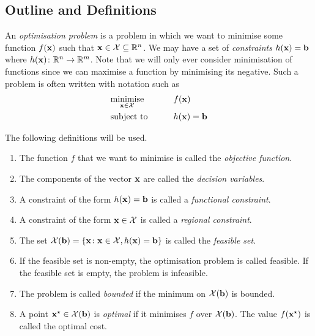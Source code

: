 \subsection{Outline and Definitions}
An \textit{optimisation problem} is a problem in which we want to minimise some function \(f(\vb x)\) such that \(\vb x \in \mathcal X \subseteq \mathbb R^n\).
We may have a set of \textit{constraints} \(h(\vb x) = \vb b\) where \(h(\vb x) \colon \mathbb R^n \to \mathbb R^m\).
Note that we will only ever consider minimisation of functions since we can maximise a function by minimising its negative.
Such a problem is often written with notation such as
\begin{alignat*}{2}
	 & \underset{\vb x \in \mathcal X}{\text{minimise}} & \qquad & f(\vb x)         \\
	 & \text{subject to}                                &        & h(\vb x) = \vb b
\end{alignat*}

\begin{definition}
	The following definitions will be used.
	\begin{enumerate}
		\item The function \(f\) that we want to minimise is called the \textit{objective function}.
		\item The components of the vector \(\vb x\) are called the \textit{decision variables}.
		\item A constraint of the form \(h(\vb x) = \vb b\) is called a \textit{functional constraint}.
		\item A constraint of the form \(\vb x \in \mathcal X\) is called a \textit{regional constraint}.
		\item The set \( \mathcal X(\vb b) = \qty{\vb x \colon \vb x \in \mathcal X, h(\vb x) = \vb b} \) is called the \textit{feasible set}.
		\item If the feasible set is non-empty, the optimisation problem is called feasible.
		      If the feasible set is empty, the problem is infeasible.
		\item The problem is called \textit{bounded} if the minimum on \(\mathcal X(\vb b)\) is bounded.
		\item A point \(\vb x^\star \in \mathcal X(\vb b)\) is \textit{optimal} if it minimises \(f\) over \(\mathcal X(\vb b)\).
		      The value \(f(\vb x^\star)\) is called the optimal cost.
	\end{enumerate}
\end{definition}

